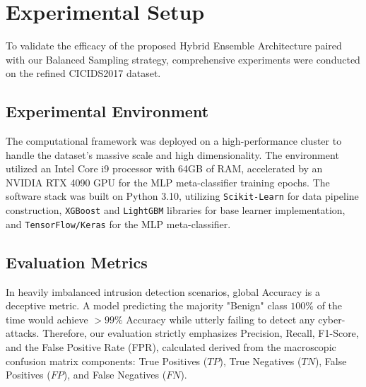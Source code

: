 \section{Experimental Setup}
To validate the efficacy of the proposed Hybrid Ensemble Architecture paired with our Balanced Sampling strategy, comprehensive experiments were conducted on the refined CICIDS2017 dataset.

\subsection{Experimental Environment}
The computational framework was deployed on a high-performance cluster to handle the dataset's massive scale and high dimensionality. The environment utilized an Intel Core i9 processor with 64GB of RAM, accelerated by an NVIDIA RTX 4090 GPU for the MLP meta-classifier training epochs. The software stack was built on Python 3.10, utilizing \texttt{Scikit-Learn} for data pipeline construction, \texttt{XGBoost} and \texttt{LightGBM} libraries for base learner implementation, and \texttt{TensorFlow/Keras} for the MLP meta-classifier.

\subsection{Evaluation Metrics}
In heavily imbalanced intrusion detection scenarios, global Accuracy is a deceptive metric. A model predicting the majority "Benign" class $100\%$ of the time would achieve $>99\%$ Accuracy while utterly failing to detect any cyber-attacks. Therefore, our evaluation strictly emphasizes Precision, Recall, F1-Score, and the False Positive Rate (FPR), calculated derived from the macroscopic confusion matrix components: True Positives ($TP$), True Negatives ($TN$), False Positives ($FP$), and False Negatives ($FN$).

